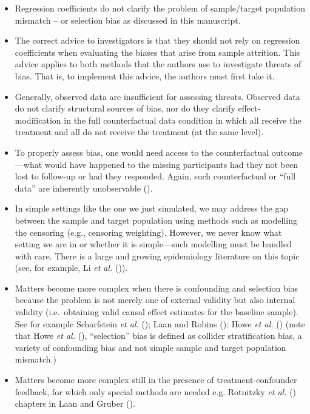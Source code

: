 \documentclass[
  singlecolumn]{article}
\providecommand{\tightlist}{%
  \setlength{\itemsep}{0pt}\setlength{\parskip}{0pt}}\usepackage{longtable,booktabs,array}
\begin{document}
\begin{itemize}
\tightlist
\item
  Regression coefficients do not clarify the problem of sample/target
  population mismatch -- or selection bias as discussed in this
  manuscript.
\item
  The correct advice to investigators is that they should not rely on
  regression coefficients when evaluating the biases that arise from
  sample attrition. This advice applies to both methods that the authors
  use to investigate threats of bias. That is, to implement this advice,
  the authors must first take it.
\item
  Generally, observed data are insufficient for assessing threats.
  Observed data do not clarify structural sources of bias, nor do they
  clarify effect-modification in the full counterfactual data condition
  in which all receive the treatment and all do not receive the
  treatment (at the same level).
\item
  To properly assess bias, one would need access to the counterfactual
  outcome---what would have happened to the missing participants had
  they not been lost to follow-up or had they responded. Again, such
  counterfactual or ``full data'' are inherently unobservable
  ().
\item
  In simple settings like the one we just simulated, we may address the
  gap between the sample and target population using methods such as
  modelling the censoring (e.g., censoring weighting). However, we never
  know what setting we are in or whether it is simple---such modelling
  must be handled with care. There is a large and growing epidemiology
  literature on this topic (see, for example, Li \emph{et al.}
  ()).
\item
  Matters become more complex when there is confounding and selection
  bias because the problem is not merely one of external validity but
  also internal validity (i.e.~obtaining valid causal effect estimates
  for the baseline sample). See for example Scharfstein \emph{et al.}
  (); Laan and Robins
  (); Howe \emph{et al.}
  () (note that Howe \emph{et al.}
  (), ``selection'' bias is
  defined as collider stratification bias, a variety of confounding bias
  and not simple sample and target population mismatch.)\\
\item
  Matters become more complex still in the presence of
  treatment-confounder feedback, for which only special methods are
  needed e.g. Rotnitzky \emph{et al.}
  () chapters in Laan and
  Gruber ().
\end{itemize}
\end{document}

